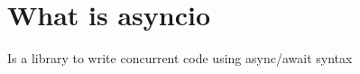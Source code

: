 \documentclass{scrartcl}
\begin{document}
\part{What is asyncio}

Is  a library to write concurrent code using async/await syntax
\end{document}
